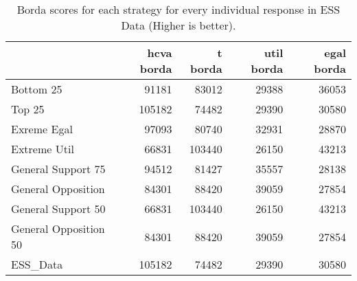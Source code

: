 \begin{table}
\caption{Borda scores for each strategy for every individual response in ESS Data (Higher is better).}
\begin{tabular}{lrrrr}
\toprule
 & hcva borda & t borda & util borda & egal borda \\
\midrule
Bottom 25 & 91181 & 83012 & 29388 & 36053 \\
Top 25 & 105182 & 74482 & 29390 & 30580 \\
Exreme Egal & 97093 & 80740 & 32931 & 28870 \\
Extreme Util & 66831 & 103440 & 26150 & 43213 \\
General Support 75 & 94512 & 81427 & 35557 & 28138 \\
General Opposition & 84301 & 88420 & 39059 & 27854 \\
General Support 50 & 66831 & 103440 & 26150 & 43213 \\
General Opposition 50 & 84301 & 88420 & 39059 & 27854 \\
ESS_Data & 105182 & 74482 & 29390 & 30580 \\
\bottomrule
\end{tabular}
\end{table}

